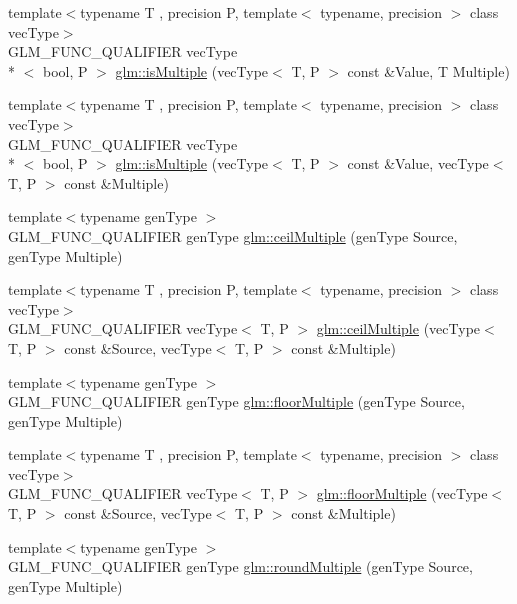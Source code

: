 \begin{DoxyCompactItemize}
\item 
{\footnotesize template$<$typename T , precision P, template$<$ typename, precision $>$ class vec\-Type$>$ }\\G\-L\-M\-\_\-\-F\-U\-N\-C\-\_\-\-Q\-U\-A\-L\-I\-F\-I\-E\-R vec\-Type\\*
$<$ bool, P $>$ \hyperlink{group__gtc__round_ga50ea5d5dc33fffba39ad6002a3784123}{glm\-::is\-Multiple} (vec\-Type$<$ T, P $>$ const \&Value, T Multiple)
\item 
{\footnotesize template$<$typename T , precision P, template$<$ typename, precision $>$ class vec\-Type$>$ }\\G\-L\-M\-\_\-\-F\-U\-N\-C\-\_\-\-Q\-U\-A\-L\-I\-F\-I\-E\-R vec\-Type\\*
$<$ bool, P $>$ \hyperlink{group__gtc__round_ga7ae705574ef3e3ebfb4f537d8d285c48}{glm\-::is\-Multiple} (vec\-Type$<$ T, P $>$ const \&Value, vec\-Type$<$ T, P $>$ const \&Multiple)
\item 
{\footnotesize template$<$typename gen\-Type $>$ }\\G\-L\-M\-\_\-\-F\-U\-N\-C\-\_\-\-Q\-U\-A\-L\-I\-F\-I\-E\-R gen\-Type \hyperlink{group__gtc__round_gac84898c466e609cdd2e81d9ba907d9e8}{glm\-::ceil\-Multiple} (gen\-Type Source, gen\-Type Multiple)
\item 
{\footnotesize template$<$typename T , precision P, template$<$ typename, precision $>$ class vec\-Type$>$ }\\G\-L\-M\-\_\-\-F\-U\-N\-C\-\_\-\-Q\-U\-A\-L\-I\-F\-I\-E\-R vec\-Type$<$ T, P $>$ \hyperlink{group__gtc__round_gafe632af669ac57d670ca18e3665a12ca}{glm\-::ceil\-Multiple} (vec\-Type$<$ T, P $>$ const \&Source, vec\-Type$<$ T, P $>$ const \&Multiple)
\item 
{\footnotesize template$<$typename gen\-Type $>$ }\\G\-L\-M\-\_\-\-F\-U\-N\-C\-\_\-\-Q\-U\-A\-L\-I\-F\-I\-E\-R gen\-Type \hyperlink{group__gtc__round_ga9eafb9dbedf84e5cece65c2fe9d5631d}{glm\-::floor\-Multiple} (gen\-Type Source, gen\-Type Multiple)
\item 
{\footnotesize template$<$typename T , precision P, template$<$ typename, precision $>$ class vec\-Type$>$ }\\G\-L\-M\-\_\-\-F\-U\-N\-C\-\_\-\-Q\-U\-A\-L\-I\-F\-I\-E\-R vec\-Type$<$ T, P $>$ \hyperlink{group__gtc__round_ga6912db42d43873fe1dedb3aed2b7a239}{glm\-::floor\-Multiple} (vec\-Type$<$ T, P $>$ const \&Source, vec\-Type$<$ T, P $>$ const \&Multiple)
\item 
{\footnotesize template$<$typename gen\-Type $>$ }\\G\-L\-M\-\_\-\-F\-U\-N\-C\-\_\-\-Q\-U\-A\-L\-I\-F\-I\-E\-R gen\-Type \hyperlink{group__gtc__round_ga6739d1de04b2cea7c78675b365644bce}{glm\-::round\-Multiple} (gen\-Type Source, gen\-Type Multiple)

\end{DoxyCompactItemize}
